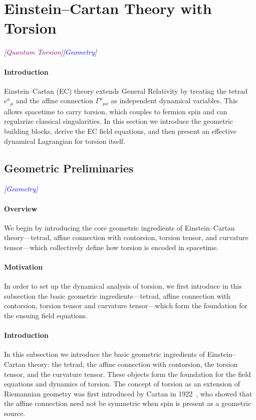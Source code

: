 \documentclass{article}
\newcommand{\geometrytag}{\textcolor{blue}{\textit{[Geometry]}}}
\newcommand{\quantumtag}{\textcolor{purple}{\textit{[Quantum Torsion]}}}
\begin{document}
\clearpage





\section{Einstein–Cartan Theory with Torsion}
\label{sec:EC-torsion}
\quantumtag   \geometrytag


\paragraph{Introduction}
Einstein–Cartan (EC) theory extends General Relativity by treating the tetrad $e^a{}_\mu$ and the affine connection $\Gamma^\rho{}_{\mu\nu}$ as independent dynamical variables.  This allows spacetime to carry torsion, which couples to fermion spin and can regularize classical singularities.  In this section we introduce the geometric building blocks, derive the EC field equations, and then present an effective dynamical Lagrangian for torsion itself.


\subsection{Geometric Preliminaries}
\geometrytag
\paragraph{Overview}
We begin by introducing the core geometric ingredients of Einstein–Cartan theory—tetrad, affine connection with contorsion, torsion tensor, and curvature tensor—which collectively define how torsion is encoded in spacetime.


\label{sec:EC-geom}
\paragraph{Motivation}
In order to set up the dynamical analysis of torsion, we first introduce in this subsection the basic geometric ingredients—tetrad, affine connection with contorsion, torsion tensor and curvature tensor—which form the foundation for the ensuing field equations.


\paragraph{Introduction}
In this subsection we introduce the basic geometric ingredients of Einstein–Cartan theory: the tetrad, the affine connection with contorsion, the torsion tensor, and the curvature tensor. These objects form the foundation for the field equations and dynamics of torsion.
The concept of torsion as an extension of Riemannian geometry was first introduced by Cartan in 1922~\cite{cartan1922}, who showed that the affine connection need not be symmetric when spin is present as a geometric source.
\end{document}
